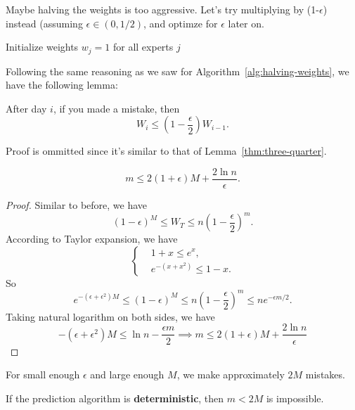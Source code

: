 Maybe halving the weights is too aggressive. Let's try multiplying by (1-$\epsilon$) instead (assuming $\epsilon \in (0, 1/2)$, and optimze for $\epsilon$ later on.

\begin{algorithm}
    \caption{Deterministic MWU Algorithm}
    \label{alg:deterministic-weights}
    Initialize weights $w_j = 1$ for all experts $j$\;
\end{algorithm}

Following the same reasoning as we saw for Algorithm~\ref{alg:halving-weights}, we have the following lemma:

\begin{lemma}\label{thm:one-minus-eps}
  After day $i$, if you made a mistake, then
  \[ W_i \leq \left(1 - \frac{\epsilon}{2}\right) W_{i-1}. \]
\end{lemma}
Proof is ommitted since it's similar to that of Lemma~\ref{thm:three-quarter}.

\begin{theorem}
  \[ m \leq 2(1+\epsilon) M + \frac{2 \ln n}{\epsilon}. \]
  \end{theorem}

\begin{proof}
  Similar to before, we have
  \[ (1 - \epsilon)^M \leq W_T \leq n \left(1 - \frac{\epsilon}{2}\right)^m. \]
  According to Taylor expansion, we have
  \[ \left\{ \begin{aligned}
    &1+x \leq e^x,\\
    &e^{-(x+x^2)}\leq 1 - x.
    \end{aligned} \right. \]
    So
    \[ e^{-(\epsilon + \epsilon^2) M} \leq (1-\epsilon)^M \leq n \left(1 - \frac{\epsilon}{2}\right)^m \leq n e^{-\epsilon m/2}. \]
    Taking natural logarithm on both sides, we have
    \[ -(\epsilon + \epsilon^2) M \leq \ln n - \frac{\epsilon m}{2} \implies m \leq 2(1+\epsilon) M + \frac{2 \ln n}{\epsilon}\]
\end{proof}

\begin{remark}
  For small enough $\epsilon$ and large enough $M$, we make approximately $2M$ mistakes.
\end{remark}

\begin{theorem} \label{thm:deterministic-lower-bound}
  If the prediction algorithm is \textbf{deterministic}, then $m<2M$ is impossible.
\end{theorem}

